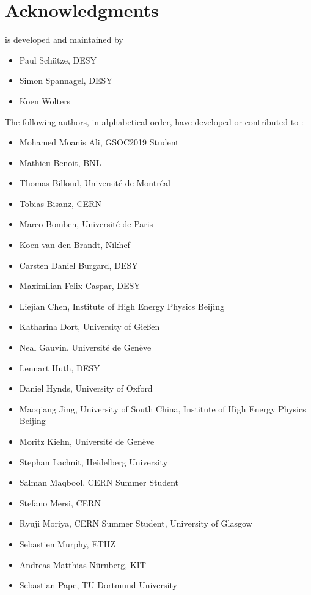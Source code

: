 \chapter{Acknowledgments}

\apsq is developed and maintained by

\begin{itemize}
    \item Paul Schütze, DESY
    \item Simon Spannagel, DESY
    \item Koen Wolters
\end{itemize}

The following authors, in alphabetical order, have developed or contributed to \apsq:

\begin{itemize}
\item Mohamed Moanis Ali, GSOC2019 Student
\item Mathieu Benoit, BNL
\item Thomas Billoud, Université de Montréal
\item Tobias Bisanz, CERN
\item Marco Bomben, Université de Paris
\item Koen van den Brandt, Nikhef
\item Carsten Daniel Burgard, DESY
\item Maximilian Felix Caspar, DESY
\item Liejian Chen, Institute of High Energy Physics Beijing
\item Katharina Dort, University of Gie\ss en
\item Neal Gauvin, Université de Genève
\item Lennart Huth, DESY
\item Daniel Hynds, University of Oxford
\item Maoqiang Jing, University of South China, Institute of High Energy Physics Beijing
\item Moritz Kiehn, Université de Genève
\item Stephan Lachnit, Heidelberg University
\item Salman Maqbool, CERN Summer Student
\item Stefano Mersi, CERN
\item Ryuji Moriya, CERN Summer Student, University of Glasgow
\item Sebastien Murphy, ETHZ
\item Andreas Matthias Nürnberg, KIT
\item Sebastian Pape, TU Dortmund University

\end{itemize}
